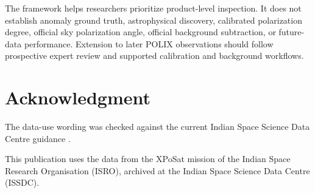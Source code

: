 \documentclass[conference]{IEEEtran}
\begin{document}
The framework helps researchers prioritize product-level inspection. It does not establish anomaly ground truth, astrophysical discovery, calibrated polarization degree, official sky polarization angle, official background subtraction, or future-data performance. Extension to later POLIX observations should follow prospective expert review and supported calibration and background workflows.


\section*{Acknowledgment}

The data-use wording was checked against the current Indian Space Science Data Centre guidance \cite{issdc_xposat_ack}.


This publication uses the data from the XPoSat mission of the Indian Space Research Organisation (ISRO), archived at the Indian Space Science Data Centre (ISSDC).





\end{document}
